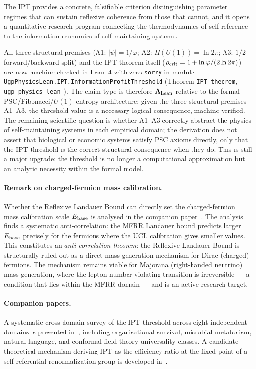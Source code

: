 \documentclass[11pt,twocolumn]{article}
\newcommand{\CatAL}{\ensuremath{\textbf{A}_{\rm Lean}}}
\theoremstyle{remark}
\begin{document}
The IPT provides a concrete, falsifiable criterion distinguishing
parameter regimes that can sustain reflexive coherence from those
that cannot, and it opens a quantitative research program connecting
the thermodynamics of self-reference to the information economics
of self-maintaining systems.

All three structural premises (A1: $|\psi|=1/\varphi$; A2: $H(U(1))=\ln 2\pi$; A3: $1/2$ forward/backward split) and the IPT theorem itself ($\rho_{\rm crit} = 1 + \ln\varphi/(2\ln 2\pi)$) are now machine-checked in Lean~4 with zero \texttt{sorry} in module \texttt{UgpPhysicsLean.\allowbreak{}IPT.\allowbreak{}InformationProfitThreshold} (Theorem \texttt{IPT\_theorem}, \texttt{ugp-physics-lean}~\cite{ugp-physics-lean}). The claim type is therefore $\CatAL$ relative to the formal PSC/Fibonacci/$U(1)$-entropy architecture: given the three structural premises A1--A3, the threshold value is a necessary logical consequence, machine-verified.  The remaining scientific question is whether A1--A3 correctly abstract the physics of self-maintaining systems in each empirical domain; the derivation does not assert that biological or economic systems satisfy PSC axioms directly, only that the IPT threshold is the correct structural consequence when they do.  This is still a major upgrade: the threshold is no longer a computational approximation but an analytic necessity within the formal model.

\paragraph{Remark on charged-fermion mass calibration.}
Whether the Reflexive Landauer Bound can directly set the charged-fermion mass calibration scale $E_{\rm base}$ is analysed in the companion paper~\cite{Spivack2026_SM_UGP}.  The analysis finds a systematic anti-correlation: the MFRR Landauer bound predicts larger $E_{\rm base}$ precisely for the fermions where the UCL calibration gives smaller values.  This constitutes an \emph{anti-correlation theorem}: the Reflexive Landauer Bound is structurally ruled out as a direct mass-generation mechanism for Dirac (charged) fermions.  The mechanism remains viable for Majorana (right-handed neutrino) mass generation, where the lepton-number-violating transition is irreversible --- a condition that lies within the MFRR domain --- and is an active research target.

\paragraph{Companion papers.}
A systematic cross-domain survey of the IPT threshold across eight independent
domains is presented in~\cite{SpivackGeneralSelection}, including organisational
survival, microbial metabolism, natural language, and conformal field theory
universality classes. A candidate theoretical mechanism deriving IPT as the
efficiency ratio at the fixed point of a self-referential renormalization group
is developed in~\cite{SpivackSRRG}.
\end{document}
